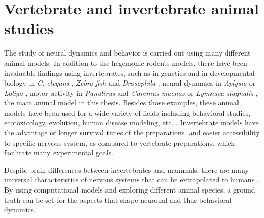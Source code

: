 \section{Vertebrate and invertebrate animal studies}
\label{c-intro-invertebrates}
The study of neural dynamics and behavior is carried out using many different animal models. In addition to the hegemonic rodents models, there have been invaluable findings using invertebrates, such as in genetics and in developmental biology in \textit{C. elegans} \parencite{brenner_genetics_1974}, \textit{Zebra fish} \parencite{streisinger_production_1981} and \textit{Drosophila} \parencite{nusslein-volhard_mutations_1980}; neural dynamics in \textit{Aplysia} \parencite{wachtel_direct_1967} or \textit{Loligo} \parencite{hodgkin_quantitative_1952}, motor activity in \textit{Panulirus} \parencite{selverston_stomatogastric_1976} and \textit{Carcinus maenas} \parencite{eisen_mechanisms_1982} or \textit{Lymnaea stagnalis} \parencite{benjamin_centraldecastro}, the main animal model in this thesis. Besides those examples, these animal models have been used for a wide variety of fields including behavioral studies, ecotoxicology, evolution, human disease modeling, etc. \parencite{romanova_animal_2018}. Invertebrate models have the advantage of longer survival times of the preparations, and easier accessibility to specific nervous system, as compared to vertebrate preparations, which facilitate many experimental goals.

Despite brain differences between invertebrates and mammals, there are many universal characteristics of nervous systems that can be extrapolated to humans \parencite{preuss_taking_2000}. By using computational models and exploring different animal species, a ground truth can be set for the aspects that shape neuronal and thus  behavioral dynamics. 


